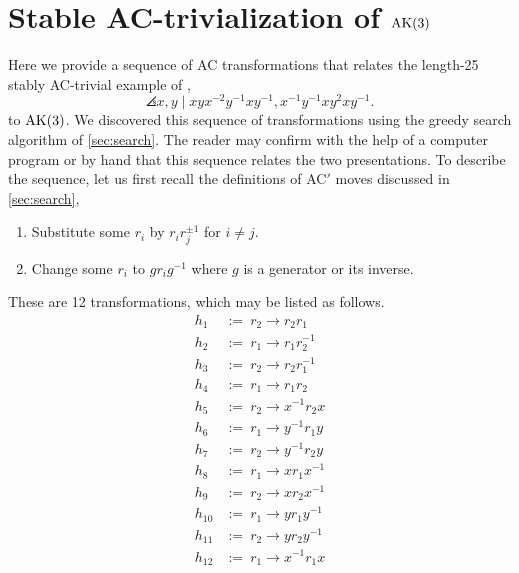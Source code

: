 
\section{Stable AC-trivialization of $\text{AK}(3)$}\label{sec:stable_ak3}

Here we provide a sequence of AC transformations that relates the length-25 stably AC-trivial example of \cite{MMS}, 
\[
\angles{x, y \mid xyx^{-2}y^{-1} xy^{-1}, x^{-1} y^{-1} x y^2 x y^{-1}}.
\]
to $\text{AK}(3)$. We discovered this sequence of transformations using the greedy search algorithm of \autoref{sec:search}. The reader may confirm with the help of a computer program or by hand that this sequence relates the two presentations. To describe the sequence, let us first recall the definitions of AC$'$ moves discussed in \autoref{sec:search},
\begin{enumerate}[label=(AC$'$\arabic*)]
	\item Substitute some $r_i$ by $r_i r_j^{\pm 1}$ for $i \neq j$.
	\item Change some $r_i$ to $g r_i g^{-1}$ where $g$ is a generator or its inverse.
\end{enumerate}

These are 12 transformations, which may be listed as follows.
\[
\begin{aligned}
h_1 &:= \  r_2 \rightarrow r_2 r_1 \\
h_2 &:= \ r_1 \rightarrow r_1 r_2^{-1} \\
h_3 &:= \ r_2 \rightarrow r_2 r_1^{-1} \\
h_4 &:= \ r_1 \rightarrow r_1 r_2 \\
h_5 &:= \ r_2 \rightarrow x^{-1} r_2 x \\
h_6 &:= \ r_1 \rightarrow y^{-1} r_1 y \\
h_7 &:= \ r_2 \rightarrow y^{-1} r_2 y \\
h_8 &:= \ r_1 \rightarrow x r_1 x^{-1} \\
h_9 &:= \ r_2 \rightarrow x r_2 x^{-1} \\
h_{10} &:= \ r_1 \rightarrow y r_1 y^{-1} \\
h_{11} &:= \ r_2 \rightarrow y r_2 y^{-1} \\
h_{12} &:= \ r_1 \rightarrow x^{-1} r_1 x 
\end{aligned}
\]

